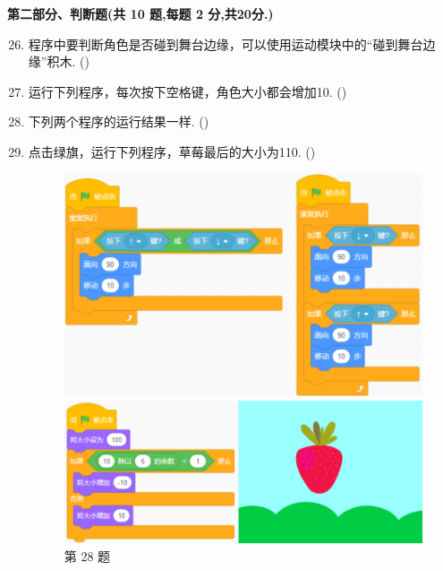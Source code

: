 \documentclass[10pt, a4paper]{article}
\begin{document}
    \newpage
    {\noindent\textbf{第二部分、判断题(共 10 题,每题 2 分,共20分.)}}
    \begin{enumerate}
        \setcounter{enumi}{25}
        \item 程序中要判断角色是否碰到舞台边缘，可以使用运动模块中的“碰到舞台边缘”积木. (\qquad)

        \item 运行下列程序，每次按下空格键，角色大小都会增加10. (\qquad)

        \item 下列两个程序的运行结果一样. (\qquad)

        \item 点击绿旗，运行下列程序，草莓最后的大小为110. (\qquad)

        \begin{figure}[htbp]
            \centering
            \begin{minipage}[t]{.4\textwidth}
                \centering
                \includegraphics[width=\textwidth]{28.png}
                \caption*{第 28 题}
            \end{minipage}
            \begin{minipage}[t]{.43\textwidth}
                \centering
                \includegraphics[width=\textwidth]{29.png}

\end{minipage}
\end{figure}
\end{enumerate}
\end{document}
